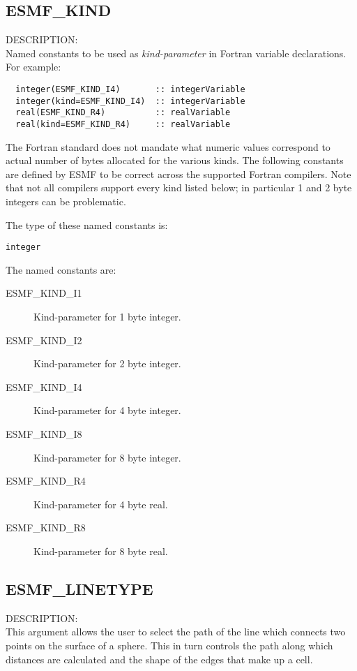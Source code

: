 \subsection{ESMF\_KIND}
\label{const:kind}

{\sf DESCRIPTION:\\}
Named constants to be used as {\em kind-parameter} in Fortran variable
 declarations. For example:
\begin{verbatim}
  integer(ESMF_KIND_I4)       :: integerVariable
  integer(kind=ESMF_KIND_I4)  :: integerVariable
  real(ESMF_KIND_R4)          :: realVariable
  real(kind=ESMF_KIND_R4)     :: realVariable
\end{verbatim}
The Fortran standard does not mandate what numeric values correspond to
actual number of bytes allocated for the various kinds. The following constants
are defined by ESMF to be correct across the supported Fortran compilers.
Note that not all compilers support every kind listed below; in particular
1 and 2 byte integers can be problematic.

The type of these named constants is:

{\tt integer}

The named constants are:
\begin{description}
\item [ESMF\_KIND\_I1]
      Kind-parameter for 1 byte integer.
\item [ESMF\_KIND\_I2]
      Kind-parameter for 2 byte integer.
\item [ESMF\_KIND\_I4]
      Kind-parameter for 4 byte integer.
\item [ESMF\_KIND\_I8]
      Kind-parameter for 8 byte integer.
\item [ESMF\_KIND\_R4]
      Kind-parameter for 4 byte real.
\item [ESMF\_KIND\_R8]
      Kind-parameter for 8 byte real.
\end{description}


\subsection{ESMF\_LINETYPE}
\label{opt:lineType}

{\sf DESCRIPTION:\\}  This argument allows the user to select the path of the line which connects two points on the surface of a sphere.
This in turn controls the path along which distances are calculated and the shape of the edges that make up a cell. 

